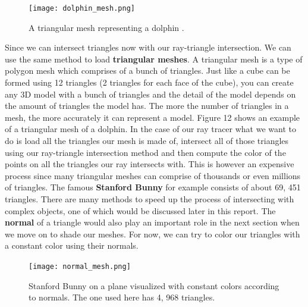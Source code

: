 \documentclass[11pt,a4paper]{article}
\begin{document}
	\begin{figure}
		\centering
		\texttt{[image: dolphin\_mesh.png]}
		\caption{A triangular mesh representing a dolphin \protect\cite{trianglemesh}.}\label{fig:dolphin mesh}
	\end{figure}
	Since we can intersect triangles now with our ray-triangle intersection. We can use the same method to load \textbf{triangular meshes}. A triangular mesh is a type of polygon mesh which comprises of a bunch of triangles. Just like a cube can be formed using 12 triangles (2 triangles for each face of the cube), you can create any 3D model with a bunch of triangles and the detail of the model depends on the amount of triangles the model has. The more the number of triangles in a mesh, the more accurately it can represent a model. Figure 12 shows an example of a triangular mesh of a dolphin. In the case of our ray tracer what we want to do is load all the triangles our mesh is made of, intersect all of those triangles using our ray-triangle intersection method and then compute the color of the points on all the triangles our ray intersects with. This is however an expensive process since many triangular meshes can comprise of thousands or even millions of triangles. The famous \textbf{Stanford Bunny} \cite{stanfordbunny} for example consists of about 69, 451 triangles. There are many methods to speed up the process of intersecting with complex objects, one of which would be discussed later in this report. The \textbf{normal} of a triangle would also play an important role in the next section when we move on to shade our meshes. For now, we can try to color our triangles with a constant color using their normals.
	\\
	\begin{figure}[H]
		\centering
		\captionsetup{justification=centering}
		\texttt{[image: normal\_mesh.png]}\quad
		\caption{Stanford Bunny on a plane visualized with constant colors according to normals. The one used here has 4, 968 triangles.}
	\end{figure}
	
	\endgroup
	
\end{document}
